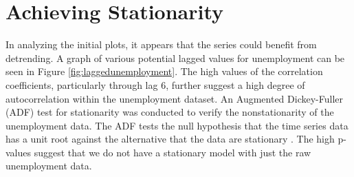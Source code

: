 \documentclass[twoside,twocolumn]{article}
\begin{document}
\section{Achieving Stationarity}

In analyzing the initial plots, it appears that the series could benefit from detrending. A graph of various potential lagged values for unemployment can be seen in Figure \ref{fig:laggedunemployment}. The high values of the correlation coefficients, particularly through lag 6, further suggest a high degree of autocorrelation within the unemployment dataset.    An Augmented Dickey-Fuller (ADF) test for stationarity was conducted to verify the nonstationarity of the unemployment data.  The ADF tests the null hypothesis that the time series data has a unit root against the alternative that the data are stationary \citep{Shumway2006}. The high p-values suggest that we do not have a stationary model with just the raw unemployment data.
\end{document}
